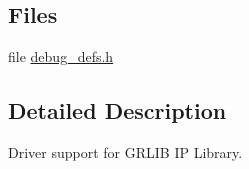 \subsection*{Files}
\begin{DoxyCompactItemize}
\item 
file \mbox{\hyperlink{debug__defs_8h}{debug\+\_\+defs.\+h}}
\end{DoxyCompactItemize}


\subsection{Detailed Description}
Driver support for G\+R\+L\+IB IP Library. 

